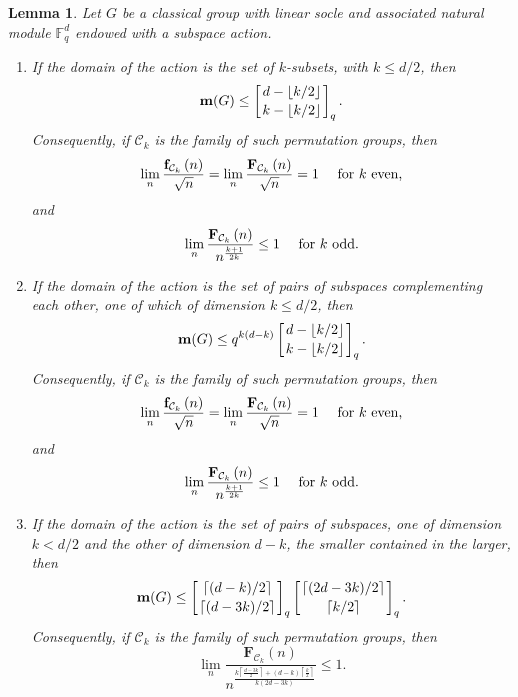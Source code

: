 \documentclass[10pt,a4paper]{amsart}
\newtheorem{lemma}{Lemma}
\newcommand{\C}{\mathcal{C}}
\newcommand{\F}{\mathbf{F}}
\newcommand{\FF}{\mathbb{F}}
\newcommand{\f}{\mathbf{f}}
\newcommand{\m}{\mathbf{m}}
\begin{document}
\begin{lemma}\label{lem:PSL}
    Let $G$ be a classical group with linear socle and associated natural module $\FF_q^d$ endowed with a subspace action.
    \begin{enumerate}[$(i)$]
        \item If the domain of the action is the set of $k$-subsets, with $k\le d/2$, then
        \[\m(G) \le \left[ d-\lfloor k/2\rfloor \atop k-\lfloor k/2\rfloor\right]_q .\]
        Consequently, if $\C_k$ is the family of such permutation groups, then
        \[ \lim_n\frac{\f_{\C_k}\left(n\right)}{\sqrt{n}} = \lim_n\frac{\F_{\C_k}\left(n\right)}{\sqrt{n}} = 1 \quad \hbox{ for } k \hbox{ even,}\]
        and
        \[ \lim_n\frac{\F_{\C_k}\left(n\right)}{n^{\frac{k+1}{2k}}} \le 1 \quad \hbox{ for } k \hbox{ odd} .\] 
        \item If the domain of the action is the set of pairs of subspaces complementing each other, one of which of dimension $k\le d/2$, then
        \[\m(G) \le q^{k(d-k)}\left[ d-\lfloor k/2\rfloor \atop k-\lfloor k/2\rfloor\right]_q .\]
        Consequently, if $\C_k$ is the family of such permutation groups, then
        \[ \lim_n\frac{\f_{\C_k}\left(n\right)}{\sqrt{n}} = \lim_n\frac{\F_{\C_k}\left(n\right)}{\sqrt{n}} = 1 \quad \hbox{ for } k \hbox{ even,}\]
        and
        \[ \lim_n\frac{\F_{\C_k}\left(n\right)}{n^{\frac{k+1}{2k}}} \le 1 \quad \hbox{ for } k \hbox{ odd} .\]
        \item If the domain of the action is the set of pairs of subspaces, one of dimension $k < d/2$ and the other of dimension $d-k$, the smaller contained in the larger, then
        \[\m(G) \le \left[ \lceil (d-k)/2 \rceil \atop \lceil (d-3k)/2\rceil \right]_q \left[ \lceil(2d -3k) /2 \rceil \atop \lceil k/2\rceil \right]_q .\]
        Consequently, if $\C_k$ is the family of such permutation groups, then
        \[ \lim_n\frac{\F_{\C_k}\left(n\right)}{n^{\frac{k \left\lceil \frac{d - 3k}{2} \right\rceil + (d-k) \left\lceil \frac{k}{2} \right\rceil}{k(2d-3k)}}} \le 1 .\]
    \end{enumerate}
\end{lemma}
\end{document}
